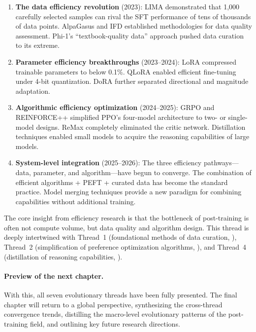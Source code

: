 \begin{enumerate}[leftmargin=2em]
  \item \textbf{The data efficiency revolution} (2023):
    LIMA demonstrated that 1,000 carefully selected samples can rival the SFT performance of tens of thousands of data points.
    AlpaGasus and IFD established methodologies for data quality assessment.
    Phi-1's ``textbook-quality data'' approach pushed data curation to its extreme.

  \item \textbf{Parameter efficiency breakthroughs} (2023--2024):
    LoRA compressed trainable parameters to below 0.1\%.
    QLoRA enabled efficient fine-tuning under 4-bit quantization.
    DoRA further separated directional and magnitude adaptation.

  \item \textbf{Algorithmic efficiency optimization} (2024--2025):
    GRPO and REINFORCE++ simplified PPO's four-model architecture to two- or single-model designs.
    ReMax completely eliminated the critic network.
    Distillation techniques enabled small models to acquire the reasoning capabilities of large models.

  \item \textbf{System-level integration} (2025--2026):
    The three efficiency pathways---data, parameter, and algorithm---have begun to converge.
    The combination of efficient algorithms + PEFT + curated data has become the standard practice.
    Model merging techniques provide a new paradigm for combining capabilities without additional training.
\end{enumerate}

The core insight from efficiency research is that the bottleneck of post-training is often not compute volume, but data quality and algorithm design.
This thread is deeply intertwined with Thread~1 (foundational methods of data curation, ),
Thread~2 (simplification of preference optimization algorithms, ), and
Thread~4 (distillation of reasoning capabilities, ).

\paragraph{Preview of the next chapter.}
With this, all seven evolutionary threads have been fully presented.
The final chapter will return to a global perspective, synthesizing the cross-thread convergence trends,
distilling the macro-level evolutionary patterns of the post-training field, and outlining key future research directions.
